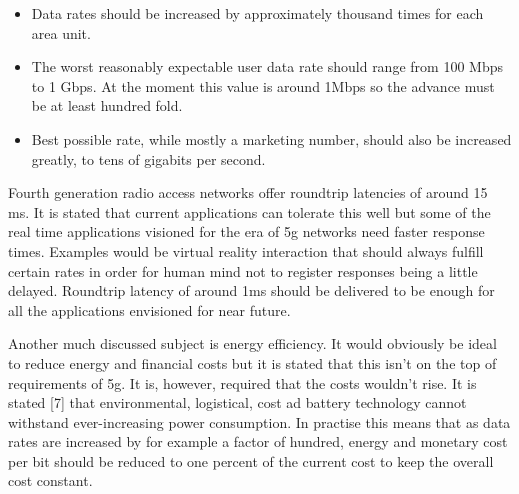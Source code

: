 \documentclass[conference]{IEEEtran}
\begin{document}
\begin{itemize}
\item Data rates should be increased by approximately thousand times for each area unit.
\item The worst reasonably expectable user data rate should range from 100 Mbps to 1 Gbps. At the moment this value is around 1Mbps so the advance must be at least hundred fold.
\item Best possible rate, while mostly a marketing number, should also be increased greatly, to tens of gigabits per second.
\end{itemize}
\par
Fourth generation radio access networks offer roundtrip latencies of around 15 ms. It is stated that current applications can tolerate this well but some of the real time applications visioned for the era of 5g networks need faster response times. Examples would be virtual reality interaction that should always fulfill certain rates in order for human mind not to register responses being a little delayed. Roundtrip latency of around 1ms should be delivered to be enough for all the applications envisioned for near future.
\par
Another much discussed subject is energy efficiency. It would obviously be ideal to reduce energy and financial costs but it is stated that this isn't on the top of requirements of 5g. It is, however, required that the costs wouldn't rise. It is stated [7] that environmental, logistical, cost ad battery technology cannot withstand ever-increasing power consumption. In practise this means that as data rates are increased by for example a factor of hundred, energy and monetary cost per bit should be reduced to one percent of the current cost to keep the overall cost constant.
\end{document}
